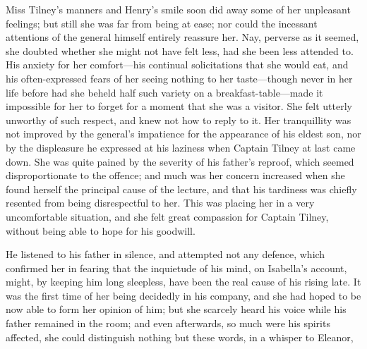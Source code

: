 Miss Tilney's manners and Henry's smile soon did away some of her unpleasant feelings; but still she was far from being at ease; nor could the incessant attentions of the general himself entirely reassure her. Nay, perverse as it seemed, she doubted whether she might not have felt less, had she been less attended to. His anxiety for her comfort---his continual solicitations that she would eat, and his often-expressed fears of her seeing nothing to her taste---though never in her life before had she beheld half such variety on a breakfast-table---made it impossible for her to forget for a moment that she was a visitor. She felt utterly unworthy of such respect, and knew not how to reply to it. Her tranquillity was not improved by the general's impatience for the appearance of his eldest son, nor by the displeasure he expressed at his laziness when Captain Tilney at last came down. She was quite pained by the severity of his father's reproof, which seemed disproportionate to the offence; and much was her concern increased when she found herself the principal cause of the lecture, and that his tardiness was chiefly resented from being disrespectful to her. This was placing her in a very uncomfortable situation, and she felt great compassion for Captain Tilney, without being able to hope for his goodwill.

He listened to his father in silence, and attempted not any defence, which confirmed her in fearing that the inquietude of his mind, on Isabella's account, might, by keeping him long sleepless, have been the real cause of his rising late. It was the first time of her being decidedly in his company, and she had hoped to be now able to form her opinion of him; but she scarcely heard his voice while his father remained in the room; and even afterwards, so much were his spirits affected, she could distinguish nothing but these words, in a whisper to Eleanor, 

